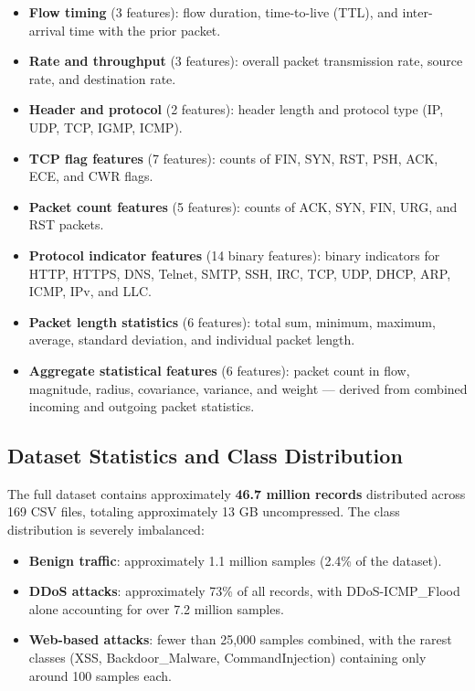 \begin{itemize}
    \item \textbf{Flow timing} (3 features): flow duration, time-to-live (TTL), and inter-arrival time with the prior packet.
    \item \textbf{Rate and throughput} (3 features): overall packet transmission rate, source rate, and destination rate.
    \item \textbf{Header and protocol} (2 features): header length and protocol type (IP, UDP, TCP, IGMP, ICMP).
    \item \textbf{TCP flag features} (7 features): counts of FIN, SYN, RST, PSH, ACK, ECE, and CWR flags.
    \item \textbf{Packet count features} (5 features): counts of ACK, SYN, FIN, URG, and RST packets.
    \item \textbf{Protocol indicator features} (14 binary features): binary indicators for HTTP, HTTPS, DNS, Telnet, SMTP, SSH, IRC, TCP, UDP, DHCP, ARP, ICMP, IPv, and LLC.
    \item \textbf{Packet length statistics} (6 features): total sum, minimum, maximum, average, standard deviation, and individual packet length.
    \item \textbf{Aggregate statistical features} (6 features): packet count in flow, magnitude, radius, covariance, variance, and weight --- derived from combined incoming and outgoing packet statistics.
\end{itemize}

\subsection{Dataset Statistics and Class Distribution}
\label{subsec:dataset_stats}

\par The full dataset contains approximately \textbf{46.7 million records} distributed across 169 CSV files, totaling approximately 13 GB uncompressed. The class distribution is severely imbalanced:

\begin{itemize}
    \item \textbf{Benign traffic}: approximately 1.1 million samples (2.4\% of the dataset).
    \item \textbf{DDoS attacks}: approximately 73\% of all records, with DDoS-ICMP\_Flood alone accounting for over 7.2 million samples.
    \item \textbf{Web-based attacks}: fewer than 25,000 samples combined, with the rarest classes (XSS, Backdoor\_Malware, CommandInjection) containing only around 100 samples each.
\end{itemize}

